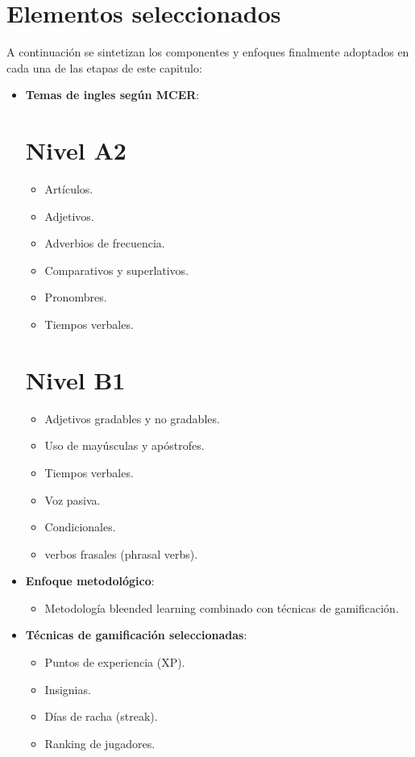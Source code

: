 \newpage
\section{Elementos seleccionados}

A continuación se sintetizan los componentes y enfoques finalmente adoptados en cada una de las etapas de este capitulo:

\begin{itemize}
  \item \textbf{Temas de ingles según MCER}:
    \section*{Nivel A2}  
        \begin{itemize}
            \item Artículos.
            \item Adjetivos.
            \item Adverbios de frecuencia.
            \item Comparativos y superlativos.
            \item Pronombres.
            \item Tiempos verbales.
        \end{itemize}


    \section*{Nivel B1}
    
    \begin{itemize}
        \item Adjetivos gradables y no gradables.
        \item Uso de mayúsculas y apóstrofes.
        \item Tiempos verbales.
        \item Voz pasiva.
        \item Condicionales.
        \item verbos frasales (phrasal verbs).
    \end{itemize}

  \item \textbf{Enfoque metodológico}:  
    \begin{itemize}
      \item Metodología bleended learning combinado con técnicas de gamificación.
    \end{itemize}

  \item \textbf{Técnicas de gamificación seleccionadas}:  
    \begin{itemize}
      \item Puntos de experiencia (XP).  
      \item Insignias.  
      \item Días de racha (streak).  
      \item Ranking de jugadores.
    \end{itemize}


\end{itemize}
